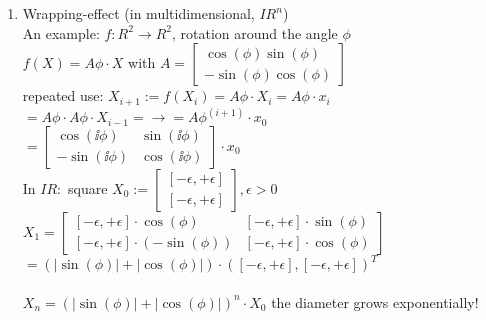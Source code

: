 \begin{itemize}
\begin{enumerate}
\begin{enumerate}
\end{enumerate}
\item Wrapping-effect (in multidimensional, $IR^n$) \\
An example: $f:R^2 \to R^2$, rotation around the angle $\phi$ \\
$f(X)=A\phi\cdot X$ with $A=\begin{bmatrix}\cos(\phi) \sin(\phi)\\ -\sin(\phi) \cos(\phi) \end{bmatrix}$ \\
repeated use: $X_{i+1}:= f(X_i)=A\phi\cdot X_i=A\phi\cdot x_i$ \\
$=A\phi\cdot A\phi\cdot X_{i-1} = \to = A\phi^{(i+1)}\cdot x_0$ \\
$=\begin{bmatrix}\cos(\ii \phi) &\sin(\ii \phi)\\ -\sin(\ii \phi) &\cos(\ii \phi) \end{bmatrix} \cdot x_0$ \\
In $IR: $ square $X_0:=\begin{bmatrix}[-\epsilon, +\epsilon]\\ [-\epsilon, +\epsilon] \end{bmatrix}, \epsilon>0 $ \\
$X_1=
\begin{bmatrix}[-\epsilon, +\epsilon]\cdot \cos(\phi) &[-\epsilon, +\epsilon]\cdot \sin(\phi)\\ 
[-\epsilon, +\epsilon]\cdot (-\sin(\phi))& [-\epsilon, +\epsilon]\cdot \cos(\phi) \end{bmatrix}$ \\
$=(|\sin(\phi)|+|\cos(\phi)|)\cdot ([-\epsilon,+\epsilon],[-\epsilon,+\epsilon])^T$ \\
\\
$X_n= (|\sin(\phi)|+|\cos(\phi)|)^n \cdot X_0$ the diameter grows exponentially!
\end{enumerate}
\end{itemize}

